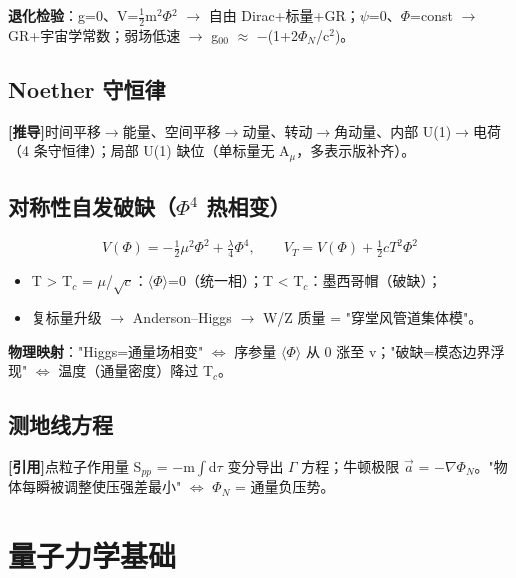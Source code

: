 \documentclass[UTF8,fontset=windows]{csoarticle}
\newcommand{\mtag}[1]{\textbf{[#1]}}
\newcommand{\up}[1]{\ensuremath{^{#1}}}
\newcommand{\down}[1]{\ensuremath{_{#1}}}
\begin{document}
\textbf{退化检验}：g=0、V=\ensuremath{\tfrac12}m\up{2}\ensuremath{\Phi}\up{2} \ensuremath{\to} 自由 Dirac+标量+GR；\ensuremath{\psi}=0、\ensuremath{\Phi}=const \ensuremath{\to} GR+宇宙学常数；弱场低速 \ensuremath{\to} g\down{00} \ensuremath{\approx} \ensuremath{-}(1+2\ensuremath{\Phi}\down{N}/c\up{2})。

\subsection{Noether 守恒律}

\mtag{推导}时间平移\ensuremath{\to}能量、空间平移\ensuremath{\to}动量、转动\ensuremath{\to}角动量、内部 U(1)\ensuremath{\to}电荷（4 条守恒律）；局部 U(1) 缺位（单标量无 A\down{\mu{}}，多表示版补齐）。

\subsection{对称性自发破缺（\ensuremath{\Phi}\up{4} 热相变）}

\[V(\Phi) = -\tfrac12\mu^2\Phi^2 + \tfrac{\lambda}{4}\Phi^4,\qquad V_T = V(\Phi) + \tfrac12 cT^2\Phi^2\]

\begin{itemize}
\item T > T\down{c} = \ensuremath{\mu}/\ensuremath{\sqrt{c}}：\ensuremath{\langle}\ensuremath{\Phi}\ensuremath{\rangle}=0（统一相）；T < T\down{c}：墨西哥帽（破缺）；
\item 复标量升级 \ensuremath{\to} Anderson--Higgs \ensuremath{\to} W/Z 质量 = "穿堂风管道集体模"。
\end{itemize}

\textbf{物理映射}："Higgs=通量场相变" \ensuremath{\iff} 序参量 \ensuremath{\langle}\ensuremath{\Phi}\ensuremath{\rangle} 从 0 涨至 v；"破缺=模态边界浮现" \ensuremath{\iff} 温度（通量密度）降过 T\down{c}。

\subsection{测地线方程}

\mtag{引用}点粒子作用量 S\down{pp} = \ensuremath{-}m\ensuremath{\int}d\ensuremath{\tau} 变分导出 \ensuremath{\Gamma} 方程；牛顿极限 \ensuremath{\vec{a}} = \ensuremath{-}\ensuremath{\nabla}\ensuremath{\Phi}\down{N}。"物体每瞬被调整使压强差最小" \ensuremath{\iff} \ensuremath{\Phi}\down{N} = 通量负压势。



\section{量子力学基础}
\end{document}

